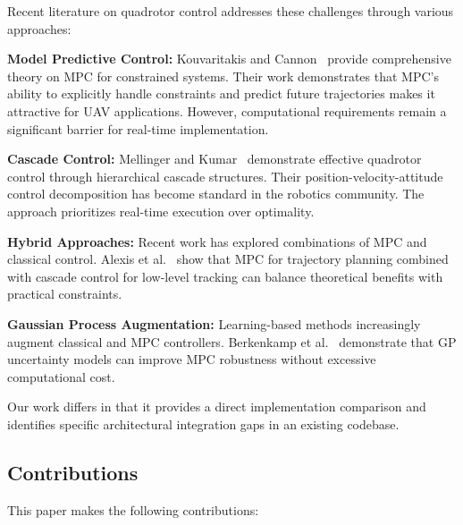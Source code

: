 \documentclass[journal]{IEEEtran}
\begin{document}
Recent literature on quadrotor control addresses these challenges through various approaches:

\textbf{Model Predictive Control:} Kouvaritakis and Cannon~\cite{IEEEexample:mpc_survey} provide comprehensive theory on MPC for constrained systems. Their work demonstrates that MPC's ability to explicitly handle constraints and predict future trajectories makes it attractive for UAV applications. However, computational requirements remain a significant barrier for real-time implementation.

\textbf{Cascade Control:} Mellinger and Kumar~\cite{IEEEexample:cascade_pid} demonstrate effective quadrotor control through hierarchical cascade structures. Their position-velocity-attitude control decomposition has become standard in the robotics community. The approach prioritizes real-time execution over optimality.

\textbf{Hybrid Approaches:} Recent work has explored combinations of MPC and classical control. Alexis et al.~\cite{IEEEexample:hybrid_control} show that MPC for trajectory planning combined with cascade control for low-level tracking can balance theoretical benefits with practical constraints.

\textbf{Gaussian Process Augmentation:} Learning-based methods increasingly augment classical and MPC controllers. Berkenkamp et al.~\cite{IEEEexample:gp_augmentation} demonstrate that GP uncertainty models can improve MPC robustness without excessive computational cost.

Our work differs in that it provides a direct implementation comparison and identifies specific architectural integration gaps in an existing codebase.

\subsection{Contributions}

This paper makes the following contributions:
\end{document}
